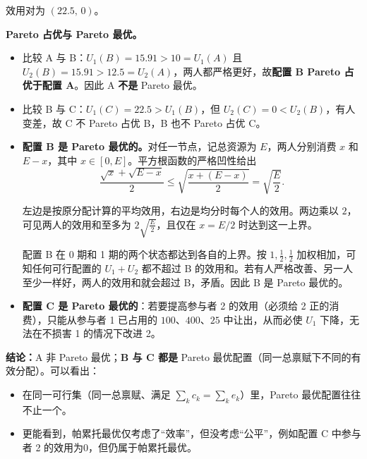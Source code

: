 \begin{tcolorbox}[example]
\begin{solution}[blank-type=manual,blank-vsep=5\baselineskip]
\begin{itemize}
            效用对为 $(22.5,\,0)$。
        \end{itemize}

        \textbf{Pareto 占优与 Pareto 最优。}
        \begin{itemize}
            \item 比较 A 与 B：$U_1(B)=15.91>10=U_1(A)$ 且 $U_2(B)=15.91>12.5=U_2(A)$，两人都严格更好，故\textbf{配置 B Pareto 占优于配置 A}。因此 A \textbf{不是} Pareto 最优。

            \item 比较 B 与 C：$U_1(C)=22.5>U_1(B)$，但 $U_2(C)=0<U_2(B)$，有人变差，故 C 不 Pareto 占优 B，B 也不 Pareto 占优 C。

            \item \textbf{配置 B 是 Pareto 最优的。}对任一节点，记总资源为 $E$，两人分别消费 $x$ 和 $E-x$，其中 $x\in[0,E]$。平方根函数的严格凹性给出
            \[
                \frac{\sqrt{x}+\sqrt{E-x}}{2}
                \le \sqrt{\frac{x+(E-x)}{2}}
                = \sqrt{\frac{E}{2}}.
            \]

            左边是按原分配计算的平均效用，右边是均分时每个人的效用。两边乘以 $2$，可见两人的效用和至多为 $2\sqrt{\frac{E}{2}}$，且仅在 $x=E/2$ 时达到这一上界。%


            配置 B 在 0 期和 1 期的两个状态都达到各自的上界。按 $1,\tfrac12,\tfrac12$ 加权相加，可知任何可行配置的 $U_1+U_2$ 都不超过 B 的效用和。若有人严格改善、另一人至少一样好，两人的效用和就会超过 B，矛盾。因此 B 是 Pareto 最优的。

            \item \textbf{配置 C 是 Pareto 最优的}：若要提高参与者 2 的效用（必须给 2 正的消费），只能从参与者 1 已占用的 $100$、$400$、$25$ 中让出，从而必使 $U_1$ 下降，无法在不损害 1 的情况下改进 2。
        \end{itemize}


    \end{solution}
\end{tcolorbox}

        \textbf{结论：}A 非 Pareto 最优；\textbf{B 与 C 都是} Pareto 最优配置（同一总禀赋下不同的有效分配）。可以看出：
        \begin{itemize}
            \item 在同一可行集（同一总禀赋、满足 $\sum_k c_k=\sum_k e_k$）里，Pareto 最优配置往往不止一个。
            \item 更能看到，帕累托最优仅考虑了“效率”，但没考虑“公平”，例如配置 C 中参与者 2 的效用为0，但仍属于帕累托最优。
        \end{itemize}



